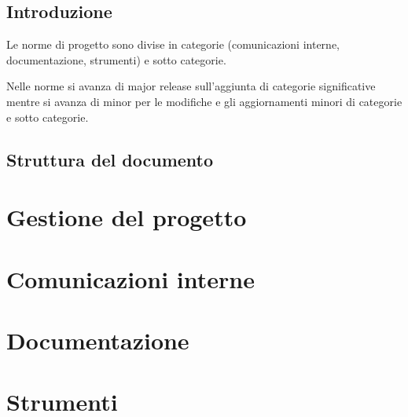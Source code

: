 \documentclass[a4paper, 12pt]{report}
\begin{document}
\tableofcontents

\newpage

\section{Introduzione}
Le norme di progetto sono divise in categorie (comunicazioni interne, documentazione, strumenti) e sotto categorie.

Nelle norme si avanza di major release sull'aggiunta di categorie significative mentre si avanza di minor per le modifiche e gli aggiornamenti minori di categorie e sotto categorie.

\section{Struttura del documento}

\chapter{Gestione del progetto}


\chapter{Comunicazioni interne}


\chapter{Documentazione}





\chapter{Strumenti}





\end{document}
